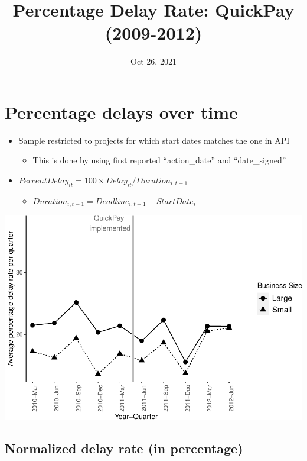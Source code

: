\documentclass[
]{article}
\title{Percentage Delay Rate: QuickPay (2009-2012)}
\author{}
\date{\vspace{-2.5em}Oct 26, 2021}
\providecommand{\tightlist}{%
  \setlength{\itemsep}{0pt}\setlength{\parskip}{0pt}}
\begin{document}
\maketitle

\hypertarget{percentage-delays-over-time}{%
\section{Percentage delays over
time}\label{percentage-delays-over-time}}

\begin{itemize}
\tightlist
\item
  Sample restricted to projects for which start dates matches the one in
  API

  \begin{itemize}
  \tightlist
  \item
    This is done by using first reported ``action\_date'' and
    ``date\_signed''
  \end{itemize}
\item
  \(PercentDelay_{it}=100 \times Delay_{it}/Duration_{i,t-1}\)

  \begin{itemize}
  \tightlist
  \item
    \(Duration_{i,t-1} = Deadline_{i,t-1} - StartDate_i\)
  \end{itemize}
\end{itemize}

\includegraphics{qp_first_pc_delay_files/figure-latex/plot_pc_delay-1.pdf}

\hypertarget{normalized-delay-rate-in-percentage}{%
\subsection{Normalized delay rate (in
percentage)}\label{normalized-delay-rate-in-percentage}}
\end{document}
